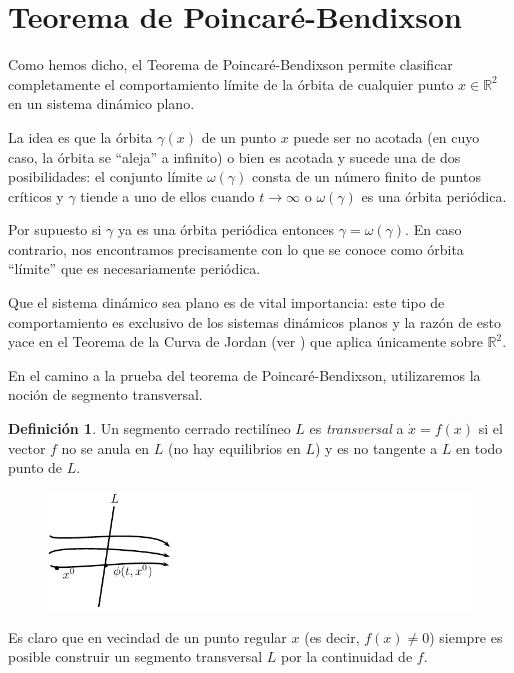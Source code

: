 \documentclass[11pt]{book}
\theoremstyle{definition}
\newtheorem{definition}{Definición}
\numberwithin{definition}{section}
\theoremstyle{theorem}
\numberwithin{theorem}{section}
\numberwithin{lemma}{section}
\numberwithin{corollary}{section}
\theoremstyle{plain}
\numberwithin{example}{section}
\newcommand{\R}{{\ensuremath{\mathbb{R}}}}
\begin{document}
\section{Teorema de Poincaré-Bendixson}

Como hemos dicho, el Teorema de Poincaré-Bendixson permite clasificar completamente el comportamiento límite de la órbita de cualquier punto $x \in \R^2$ en un sistema dinámico plano.

La idea es que la órbita $\gamma(x)$ de un punto $x$ puede ser no acotada (en cuyo caso, la órbita se ``aleja'' a infinito) o bien es acotada y sucede una de dos posibilidades: el conjunto límite $\omega(\gamma)$ consta de un número finito de puntos críticos y $\gamma$ tiende a uno de ellos cuando $t \to \infty$ o $\omega(\gamma)$ es una órbita periódica.

Por supuesto si $\gamma$ ya es una órbita periódica entonces $\gamma = \omega(\gamma)$. En caso contrario, nos encontramos precisamente con lo que se conoce como órbita ``límite'' que es necesariamente periódica.

Que el sistema dinámico sea plano es de vital importancia: este tipo de comportamiento es exclusivo de los sistemas dinámicos planos y la razón de esto yace en el Teorema de la Curva de Jordan (ver \cite{fleming,spivak}) que aplica únicamente sobre $\R^2$.

En el camino a la prueba del teorema de Poincaré-Bendixson, utilizaremos la noción de segmento transversal.

\begin{definition}Un segmento cerrado rectilíneo $L$ es \emph{transversal} a $\dot{x} = f(x)$ si el vector $f$ no se anula en $L$ (no hay equilibrios en $L$) y es no tangente a $L$ en todo punto de $L$.
\end{definition}

\begin{figure}[h] \centering
    \includegraphics[scale=1.1]{figures/transversal.pdf}
\end{figure}

Es claro que en vecindad de un punto regular $x$ (es decir, $f(x) \neq 0$) siempre es posible construir un segmento transversal $L$ por la continuidad de $f$.
\end{document}
